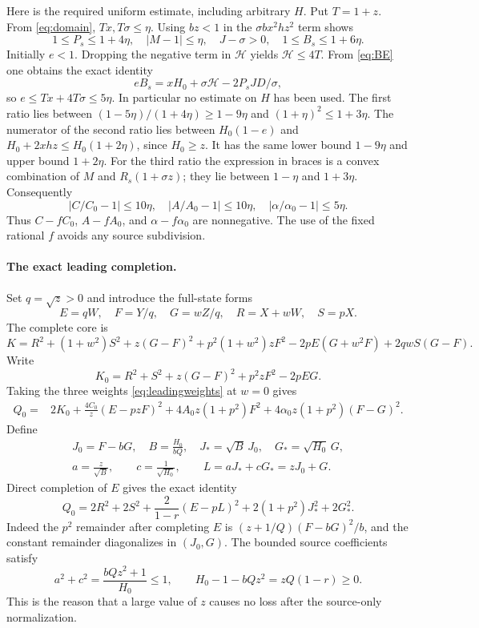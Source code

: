 \documentclass[11pt]{article}
\begin{document}
Here is the required uniform estimate, including arbitrary $H$.
Put $T=1+z$. From \eqref{eq:domain}, $Tx,T\sigma\le\eta$.
Using $bz<1$ in the $\sigma bx^2hz^2$ term shows
\[
 1\le P_s\le1+4\eta,\quad |M-1|\le\eta,\quad
 J-\sigma>0,\quad 1\le B_s\le1+6\eta.
\]
Initially $e<1$. Dropping the negative term in $\mathcal H$ yields
$\mathcal H\le4T$. From \eqref{eq:BE} one obtains the exact identity
\[
 eB_s=xH_0+\sigma\mathcal H-2P_sJD/\sigma,
\]
so $e\le Tx+4T\sigma\le5\eta$. In particular no estimate on $H$
has been used. The first ratio lies between
$(1-5\eta)/(1+4\eta)\ge1-9\eta$ and
$(1+\eta)^2\le1+3\eta$.
The numerator of the second ratio lies between
$H_0(1-e)$ and $H_0+2xhz\le H_0(1+2\eta)$, since $H_0\ge z$.
It has the same lower bound $1-9\eta$ and upper bound $1+2\eta$.
For the third ratio the expression in braces is a convex combination
of $M$ and $R_s(1+\sigma z)$; they lie between $1-\eta$ and
$1+3\eta$. Consequently
\begin{equation}\label{eq:ratioest}
 \left|C/C_0-1\right|\le10\eta,\quad
 \left|A/A_0-1\right|\le10\eta,\quad
 \left|\alpha/\alpha_0-1\right|\le5\eta.
\end{equation}
Thus $C-fC_0$, $A-fA_0$, and $\alpha-f\alpha_0$ are nonnegative.
The use of the fixed rational $f$ avoids any source subdivision.

\paragraph{The exact leading completion.}
Set $q=\sqrt z>0$ and introduce the full-state forms
\[
 E=qW,\quad F=Y/q,\quad G=wZ/q,\quad
 R=X+wW,\quad S=pX.
\]
The complete core is
\begin{equation}\label{eq:core}
 K=R^2+(1+w^2)S^2+z(G-F)^2
    +p^2(1+w^2)zF^2
    -2pE(G+w^2F)+2qwS(G-F).
\end{equation}
Write
\[
 K_0=R^2+S^2+z(G-F)^2+p^2zF^2-2pEG.
\]
Taking the three weights \eqref{eq:leadingweights} at $w=0$ gives
\begin{align*}
 Q_0={}&2K_0+\frac{4C_0}{z}(E-pzF)^2
          +4A_0z(1+p^2)F^2
          +4\alpha_0z(1+p^2)(F-G)^2.
\end{align*}
Define
\begin{gather*}
 J_0=F-bG,\quad B=\frac{H_0}{bQ},\quad
 J_* =\sqrt B\,J_0,\quad G_* =\sqrt{H_0}\,G,\\
 a=\frac z{\sqrt B},\qquad c=\frac1{\sqrt{H_0}},\qquad
 L=aJ_*+cG_*=zJ_0+G.
\end{gather*}
Direct completion of $E$ gives the exact identity
\begin{equation}\label{eq:leadingidentity}
 Q_0=2R^2+2S^2+\frac2{1-r}(E-pL)^2
              +2(1+p^2)J_*^2+2G_*^2.
\end{equation}
Indeed the $p^2$ remainder after completing $E$ is
$(z+1/Q)(F-bG)^2/b$, and the constant remainder diagonalizes in
$(J_0,G)$. The bounded source coefficients satisfy
\begin{equation}\label{eq:ac}
 a^2+c^2=\frac{bQz^2+1}{H_0}\le1,
 \qquad H_0-1-bQz^2=zQ(1-r)\ge0.
\end{equation}
This is the reason that a large value of $z$ causes no loss after the
source-only normalization.
\end{document}
